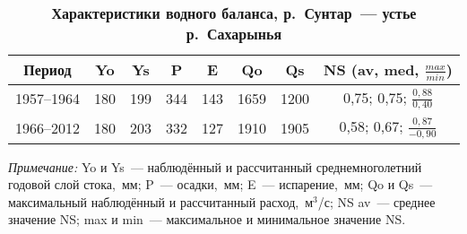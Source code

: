 
\begin{table}[H]
  \vspace{-8pt}
  \caption*{\textbf{Характеристики водного баланса, р.~Сунтар~--- устье р.~Сахарынья}}
    \vspace{-4pt}
  \label{tab:nesterova-1-tab}
  \vspace{-10pt}
  \begin{center}
  \begin{tabular}{cccccccc}
 \toprule
  Период    & Yo  & Ys  & P   & E   & Qo   & Qs   & NS 			(av, med, $\frac{max}{min}$)  \\[2pt]
 \midrule
  1957--1964 & 180 & 199 & 344 & 143 & 1659 & 1200 & 0,75; 			0,75; $\frac{0,88}{0,40}$  \\[6pt]
  1966--2012 & 180 & 203 & 332 & 127 & 1910 & 1905 & 0,58; 			0,67; $\frac{0,87}{-0,90}$ \\
\bottomrule
  \end{tabular}
\end{center}
  \vspace{-8pt}
\textit{Примечание:} Yo и Ys~--- наблюдённый и рассчитанный среднемноголетний годовой слой стока,~мм; P~--- осадки,~мм; E~--- испарение,~мм; Qo и Qs~--- максимальный наблюдённый и рассчитанный расход,~м$^3$/с; NS av~--- среднее значение NS; max и min~--- максимальное и минимальное значение NS.
  \vspace{-8pt}
\end{table}
